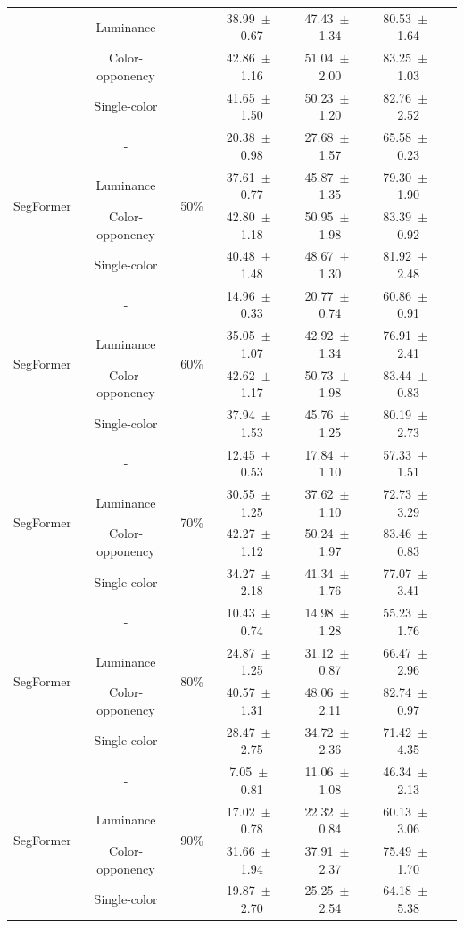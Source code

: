 \begin{table}[h]
\begin{tabular}{@{}lccc ccc@{}}
& Luminance & & 38.99~$\pm$~0.67 & 47.43~$\pm$~1.34 & 80.53~$\pm$~1.64 \\
& Color-opponency & & 42.86~$\pm$~1.16 & 51.04~$\pm$~2.00 & 83.25~$\pm$~1.03 \\
& Single-color & & 41.65~$\pm$~1.50 & 50.23~$\pm$~1.20 & 82.76~$\pm$~2.52 \\
\midrule
\multirow{4}{*}{SegFormer} & - & \multirow{4}{*}{50\%} & 20.38~$\pm$~0.98 & 27.68~$\pm$~1.57 & 65.58~$\pm$~0.23 \\
& Luminance & & 37.61~$\pm$~0.77 & 45.87~$\pm$~1.35 & 79.30~$\pm$~1.90 \\
& Color-opponency & & 42.80~$\pm$~1.18 & 50.95~$\pm$~1.98 & 83.39~$\pm$~0.92 \\
& Single-color & & 40.48~$\pm$~1.48 & 48.67~$\pm$~1.30 & 81.92~$\pm$~2.48 \\
\midrule
\multirow{4}{*}{SegFormer} & - & \multirow{4}{*}{60\%} & 14.96~$\pm$~0.33 & 20.77~$\pm$~0.74 & 60.86~$\pm$~0.91 \\
& Luminance & & 35.05~$\pm$~1.07 & 42.92~$\pm$~1.34 & 76.91~$\pm$~2.41 \\
& Color-opponency & & 42.62~$\pm$~1.17 & 50.73~$\pm$~1.98 & 83.44~$\pm$~0.83 \\
& Single-color & & 37.94~$\pm$~1.53 & 45.76~$\pm$~1.25 & 80.19~$\pm$~2.73 \\
\midrule
\multirow{4}{*}{SegFormer} & - & \multirow{4}{*}{70\%} & 12.45~$\pm$~0.53 & 17.84~$\pm$~1.10 & 57.33~$\pm$~1.51 \\
& Luminance & & 30.55~$\pm$~1.25 & 37.62~$\pm$~1.10 & 72.73~$\pm$~3.29 \\
& Color-opponency & & 42.27~$\pm$~1.12 & 50.24~$\pm$~1.97 & 83.46~$\pm$~0.83 \\
& Single-color & & 34.27~$\pm$~2.18 & 41.34~$\pm$~1.76 & 77.07~$\pm$~3.41 \\
\midrule
\multirow{4}{*}{SegFormer} & - & \multirow{4}{*}{80\%} & 10.43~$\pm$~0.74 & 14.98~$\pm$~1.28 & 55.23~$\pm$~1.76 \\
& Luminance & & 24.87~$\pm$~1.25 & 31.12~$\pm$~0.87 & 66.47~$\pm$~2.96 \\
& Color-opponency & & 40.57~$\pm$~1.31 & 48.06~$\pm$~2.11 & 82.74~$\pm$~0.97 \\
& Single-color & & 28.47~$\pm$~2.75 & 34.72~$\pm$~2.36 & 71.42~$\pm$~4.35 \\
\midrule
\multirow{4}{*}{SegFormer} & - & \multirow{4}{*}{90\%} & 7.05~$\pm$~0.81 & 11.06~$\pm$~1.08 & 46.34~$\pm$~2.13 \\
& Luminance & & 17.02~$\pm$~0.78 & 22.32~$\pm$~0.84 & 60.13~$\pm$~3.06 \\
& Color-opponency & & 31.66~$\pm$~1.94 & 37.91~$\pm$~2.37 & 75.49~$\pm$~1.70 \\
& Single-color & & 19.87~$\pm$~2.70 & 25.25~$\pm$~2.54 & 64.18~$\pm$~5.38 \\
\midrule
\bottomrule
\end{tabular}
\label{tab:sparse_results_segformer_acdc_snow}
\end{table}